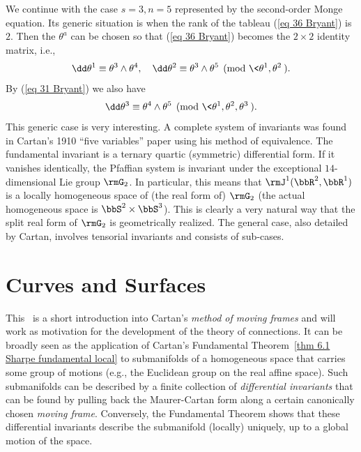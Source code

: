 We continue with the case $s=3,n=5$ represented by the second-order Monge equation. Its generic situation is when the rank of the tableau (\ref{eq 36 Bryant}) is $2$. Then the $\theta^a$ can be chosen so that (\ref{eq 36 Bryant}) becomes the $2\times 2$ identity matrix, i.e., 
\[\dd\theta^1\equiv \theta^3\wedge\theta^4,\quad\dd\theta^2\equiv \theta^3\wedge\theta^5 \pmod{\<\theta^1,\theta^2\>}.\]
By (\ref{eq 31 Bryant}) we also have 
\[\dd\theta^3\equiv \theta^4\wedge\theta^5 \pmod{\<\theta^1,\theta^2,\theta^3\>}.\]
This generic case is very interesting. A complete system of invariants was found in Cartan's 1910 ``five variables'' paper using his method of equivalence. The fundamental invariant is a ternary quartic (symmetric) differential form. If it vanishes identically, the Pfaffian system is invariant under the exceptional $14$-dimensional Lie group $\rmG_2$. In particular, this means that $\rmJ^1(\bbR^2,\bbR^1)$ is a locally homogeneous space of (the real form of) $\rmG_2$ (the actual homogeneous space is $\bbS^2\times\bbS^3$). This is clearly a very natural way that the split real form of $\rmG_2$ is geometrically realized. The general case, also detailed by Cartan, involves tensorial invariants and consists of sub-cases.













\chapter{Curves and Surfaces}\label{chap curves and surfaces}


This \chap\ is a short introduction into Cartan's \emph{method of moving frames} and will work as motivation for the development of the theory of connections. It can be broadly seen as the application of Cartan's Fundamental Theorem~\ref{thm 6.1 Sharpe fundamental local} to submanifolds of a homogeneous space that carries some group of motions (e.g.,  the Euclidean group on the real affine space). Such submanifolds can be described by a finite collection of \emph{differential invariants} that can be found by pulling back the Maurer-Cartan form along a certain canonically chosen \emph{moving frame}. Conversely, the Fundamental Theorem shows that these differential invariants describe the submanifold (locally) uniquely, up to a global motion of the space. 


